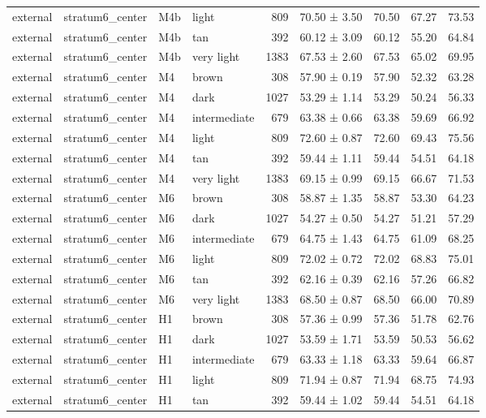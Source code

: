 \begin{tabular}{llllrlrrr}
external & stratum6\_center & M4b & light & 809 & 70.50 ± 3.50 & 70.50 & 67.27 & 73.53 \\
external & stratum6\_center & M4b & tan & 392 & 60.12 ± 3.09 & 60.12 & 55.20 & 64.84 \\
external & stratum6\_center & M4b & very light & 1383 & 67.53 ± 2.60 & 67.53 & 65.02 & 69.95 \\
external & stratum6\_center & M4 & brown & 308 & 57.90 ± 0.19 & 57.90 & 52.32 & 63.28 \\
external & stratum6\_center & M4 & dark & 1027 & 53.29 ± 1.14 & 53.29 & 50.24 & 56.33 \\
external & stratum6\_center & M4 & intermediate & 679 & 63.38 ± 0.66 & 63.38 & 59.69 & 66.92 \\
external & stratum6\_center & M4 & light & 809 & 72.60 ± 0.87 & 72.60 & 69.43 & 75.56 \\
external & stratum6\_center & M4 & tan & 392 & 59.44 ± 1.11 & 59.44 & 54.51 & 64.18 \\
external & stratum6\_center & M4 & very light & 1383 & 69.15 ± 0.99 & 69.15 & 66.67 & 71.53 \\
external & stratum6\_center & M6 & brown & 308 & 58.87 ± 1.35 & 58.87 & 53.30 & 64.23 \\
external & stratum6\_center & M6 & dark & 1027 & 54.27 ± 0.50 & 54.27 & 51.21 & 57.29 \\
external & stratum6\_center & M6 & intermediate & 679 & 64.75 ± 1.43 & 64.75 & 61.09 & 68.25 \\
external & stratum6\_center & M6 & light & 809 & 72.02 ± 0.72 & 72.02 & 68.83 & 75.01 \\
external & stratum6\_center & M6 & tan & 392 & 62.16 ± 0.39 & 62.16 & 57.26 & 66.82 \\
external & stratum6\_center & M6 & very light & 1383 & 68.50 ± 0.87 & 68.50 & 66.00 & 70.89 \\
external & stratum6\_center & H1 & brown & 308 & 57.36 ± 0.99 & 57.36 & 51.78 & 62.76 \\
external & stratum6\_center & H1 & dark & 1027 & 53.59 ± 1.71 & 53.59 & 50.53 & 56.62 \\
external & stratum6\_center & H1 & intermediate & 679 & 63.33 ± 1.18 & 63.33 & 59.64 & 66.87 \\
external & stratum6\_center & H1 & light & 809 & 71.94 ± 0.87 & 71.94 & 68.75 & 74.93 \\
external & stratum6\_center & H1 & tan & 392 & 59.44 ± 1.02 & 59.44 & 54.51 & 64.18 \\

\end{tabular}
